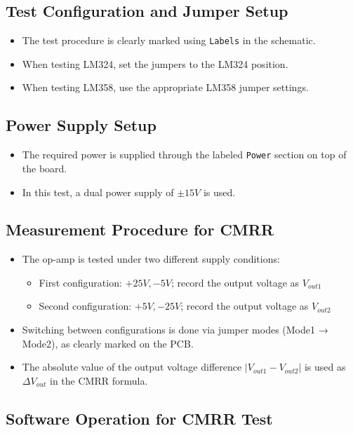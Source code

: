 \documentclass[a4paper,12pt]{article}
\begin{document}
\subsection*{Test Configuration and Jumper Setup}

\begin{itemize}
  \item The test procedure is clearly marked using \texttt{Labels} in the schematic.
  \item When testing LM324, set the jumpers to the LM324 position.
  \item When testing LM358, use the appropriate LM358 jumper settings.
\end{itemize}

\subsection*{Power Supply Setup}

\begin{itemize}
  \item The required power is supplied through the labeled \texttt{Power} section on top of the board.
  \item In this test, a dual power supply of \( \pm15V \) is used.
\end{itemize}

\subsection*{Measurement Procedure for CMRR}

\begin{itemize}
  \item The op-amp is tested under two different supply conditions:
  \begin{itemize}
    \item First configuration: \( +25V, -5V \); record the output voltage as \( V_{out1} \)
    \item Second configuration: \( +5V, -25V \); record the output voltage as \( V_{out2} \)
  \end{itemize}
  \item Switching between configurations is done via jumper modes (Mode1 → Mode2), as clearly marked on the PCB.
  \item The absolute value of the output voltage difference \( |V_{out1} - V_{out2}| \) is used as \( \Delta V_{out} \) in the CMRR formula.
\end{itemize}

\subsection*{Software Operation for CMRR Test}
\end{document}
